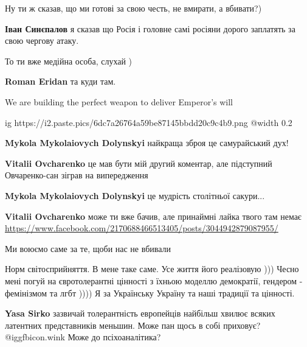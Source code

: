  
 
 
 
 
\zzSecCmt

\begin{itemize} %
Ну ти ж сказав, що ми готові за свою честь, не вмирати, а вбивати?)

\textbf{Іван Синєпалов} я сказав що Росія і головне самі росіяни дорого заплатять за свою чергову атаку.

То ти вже медійна особа, слухай )

\textbf{Roman Eridan} та куди там.

We are building the perfect weapon to deliver Emperor's will

\ifcmt
  ig https://i2.paste.pics/6dc7a26764a59be87145bbdd20c9c4b9.png
  @width 0.2
\fi

\begin{itemize} %
\textbf{Mykola Mykolaiovych Dolynskyi} найкраща зброя це самурайський дух!

\textbf{Vitalii Ovcharenko} це мав бути мій другий коментар, але підступний Овчаренко-сан зіграв на випередження

\textbf{Mykola Mykolaiovych Dolynskyi} це мудрість столітньої сакури...

\textbf{Vitalii Ovcharenko} може ти вже бачив, але принаймні лайка твого там немає
\url{https://www.facebook.com/2170688466513405/posts/3044942879087955/}
\end{itemize} %

Ми воюємо саме за те, щоби нас не вбивали


Норм світосприйняття. В мене таке саме. Усе життя його реалізовую ))) Чесно
мені погуй на євротолерантні цінності з їхньою моделлю демократії, гендером -
фемінізмом та лгбт )))) Я за Українську Україну та наші традиції та цінності.

\begin{itemize} %
\textbf{Yasa Sirko} зазвичай толерантність европейців найбільш хвилює всяких латентних представників меньшин. Може пан щось в собі приховує?  @igg{fbicon.wink}  Може до псіхоаналітика?


\end{itemize}
\end{itemize}
